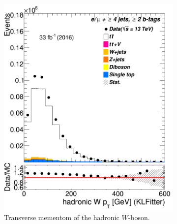 \begin{figure}
\begin{subfigure}{0.35\textwidth}
		\includegraphics[width=\linewidth]{ControlPlots_emujets_2016_4incl_2incl/klf_Whad_pt_emujets_2016.png}
		\caption{Transverse mementom of the hadronic $W$-boson.} \label{fig:37}
	\end{subfigure}
	\hspace*{1.5cm}	
	\begin{subfigure}{0.35\textwidth}

\end{subfigure}
\end{figure}
